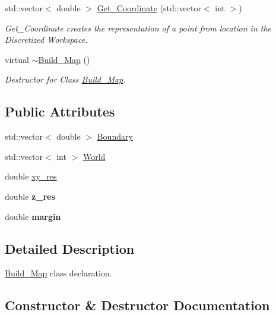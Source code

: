 \begin{DoxyCompactItemize}
std\+::vector$<$ double $>$ \hyperlink{classBuild__Map_a9a0981707bd941c8b15a286ed5cff4aa}{Get\+\_\+\+Coordinate} (std\+::vector$<$ int $>$)
\begin{DoxyCompactList}\small\item\em Get\+\_\+\+Coordinate creates the representation of a point from location in the Discretized Workspace. \end{DoxyCompactList}\item 
virtual \hyperlink{classBuild__Map_a7e9cb965ff8a968a6c3c66b8411cbadc}{$\sim$\+Build\+\_\+\+Map} ()
\begin{DoxyCompactList}\small\item\em Destructor for Class \hyperlink{classBuild__Map}{Build\+\_\+\+Map}. \end{DoxyCompactList}\end{DoxyCompactItemize}
\subsection*{Public Attributes}
\begin{DoxyCompactItemize}
\item 
std\+::vector$<$ double $>$ \hyperlink{classBuild__Map_a56252a2d4d8971e370547cdb8a67eb8f}{Boundary}
\item 
std\+::vector$<$ int $>$ \hyperlink{classBuild__Map_ae65f595ae4825d69ae9e70d664beb644}{World}
\item 
double \hyperlink{classBuild__Map_a8aaaec9d533e5ea2c98045a7727389d7}{xy\+\_\+res}
\item 
double {\bfseries z\+\_\+res}\hypertarget{classBuild__Map_a23d568ed7281ff5682fc4fc94c366ea2}{}\label{classBuild__Map_a23d568ed7281ff5682fc4fc94c366ea2}

\item 
double {\bfseries margin}\hypertarget{classBuild__Map_ae3b0853f9e6e9b8b10e81babcee41b51}{}\label{classBuild__Map_ae3b0853f9e6e9b8b10e81babcee41b51}

\end{DoxyCompactItemize}


\subsection{Detailed Description}
\hyperlink{classBuild__Map}{Build\+\_\+\+Map} class declaration. 

\subsection{Constructor \& Destructor Documentation}
